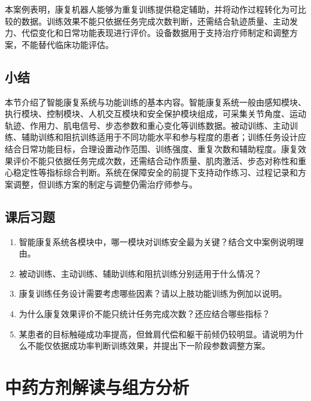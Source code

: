 本案例表明，康复机器人能够为重复训练提供稳定辅助，并将动作过程转化为可比较的数据。训练效果不能只依据任务完成次数判断，还需结合轨迹质量、主动发力、代偿变化和日常功能表现进行评价。设备数据用于支持治疗师制定和调整方案，不能替代临床功能评估。


\par
\noindent\begin{minipage}{\textwidth}
\centering
{}
\label{fig:ch10_20}
\end{minipage}
\par



\subsection*{小结}

本节介绍了智能康复系统与功能训练的基本内容。智能康复系统一般由感知模块、执行模块、控制模块、人机交互模块和安全保护模块组成，可采集关节角度、运动轨迹、作用力、肌电信号、步态参数和重心变化等训练数据。被动训练、主动训练、辅助训练和阻抗训练适用于不同功能水平和参与程度的患者；训练任务设计应结合日常功能目标，合理设置动作范围、训练强度、重复次数和辅助程度。康复效果评价不能只依据任务完成次数，还需结合动作质量、肌肉激活、步态对称性和重心稳定性等指标综合判断。系统在保障安全的前提下支持动作练习、过程记录和方案调整，但训练方案的制定与调整仍需治疗师参与。

\bigskip
\subsection*{课后习题}
\begin{enumerate}
\setlength{\itemsep}{6pt}

\item 智能康复系统各模块中，哪一模块对训练安全最为关键？结合文中案例说明理由。
\item 被动训练、主动训练、辅助训练和阻抗训练分别适用于什么情况？
\item 康复训练任务设计需要考虑哪些因素？请以上肢功能训练为例加以说明。
\item 为什么康复效果评价不能只统计任务完成次数？还应结合哪些指标？
\item 某患者的目标触碰成功率提高，但耸肩代偿和躯干前倾仍较明显。请说明为什么不能仅依据成功率判断训练效果，并提出下一阶段参数调整方案。
\end{enumerate}

\clearpage
\section{中药方剂解读与组方分析}

